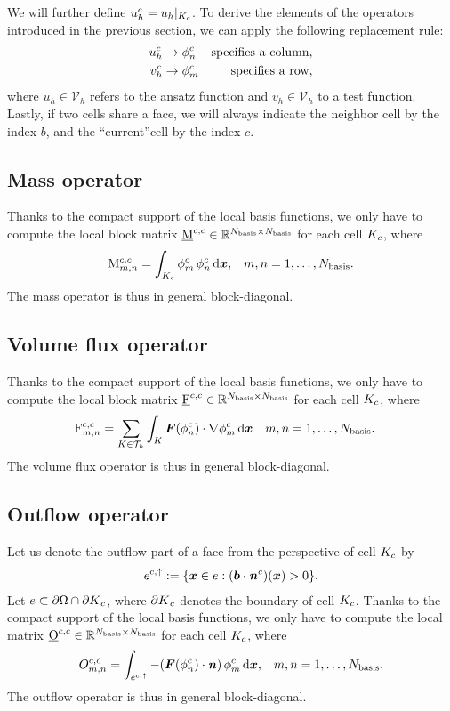 \documentclass{scrreprt}
\begin{document}
We will further define $u_h^c=u_h|_{K_c}$. 
To derive the elements of the operators introduced
in the previous section, we can apply the following replacement rule:
\begin{align}
u_h^{c} &\rightarrow \phi^{c}_{n} & \textup{specifies a column}, \\
v_h^{c} &\rightarrow \phi^{c}_{m} & \textup{specifies a row},
\end{align}
where $u_h\in\mathcal{V}_h$ refers to the ansatz function and  
$v_h\in\mathcal{V}_h$ to a test function.
Lastly, if two cells share a face, we will always indicate the 
neighbor cell by the index $b$, and the ``current''cell
by the index $c$.
\subsection{Mass operator}
Thanks to the compact support of the local basis functions,
we only have to compute the local block matrix
$\underline{\mathrm{M}}^{c,c} \in \mathbb{R}^{N_\textup{basis} \times N_\textup{basis}}$ for each
cell $K_c$, where
\begin{align}
\mathrm{M}^{c,c}_{m,n} =
\int_{K_c}
\phi^{c}_{m}\,\phi^{c}_{n} \, \text{d}{\boldsymbol x},
 && m,n = 1,\ldots,N_\textup{basis}.
\end{align}
The mass operator is thus in general block-diagonal.
\subsection{Volume flux operator}
Thanks to the compact support of the local basis functions,
we only have to compute the local block matrix
$\underline{\mathrm{F}}^{c,c} \in \mathbb{R}^{N_\textup{basis} \times N_\textup{basis}}$ for each
cell $K_c$, where
\begin{align}
\label{eq:volume_flux_op}
\mathrm{F}^{c,c}_{m,n} &= \sum_{K \in \mathcal{T}_h} \int_K {\boldsymbol F}(\phi^{c}_{n}) \cdot
\nabla \phi^{c}_{m}\,\text{d}{\boldsymbol x}
&& m,n = 1,\ldots,N_\textup{basis}.
\end{align}
The volume flux operator is thus in general block-diagonal.
\subsection{Outflow operator}
Let us denote the outflow part of a face from the perspective of cell $K_c$
by
\begin{align}
e^{c,\uparrow} := \{ {\boldsymbol x} \in e : ({\boldsymbol b} \cdot
{\boldsymbol {\mathit{n}}}^{{c}})({\boldsymbol x})> 0\}.
\end{align}
Let $e \subset {\partial\Omega} \cap {\partial K}_c$, where ${\partial K}_c$
denotes the boundary of cell $K_c$.
Thanks to the compact support of the local basis functions, we only
have to compute the local matrix $\underline{\mathrm{O}}^{c,c} \in \mathbb{R}^{N_\textup{basis}
\times N_\textup{basis}}$ for each cell $K_c$, where
\begin{align}
O^{c,c}_{m,n} =
\int_{e^{c,\uparrow}}
-
({\boldsymbol F}(\phi^{c}_{n})\cdot{\boldsymbol {\mathit{n}}})\,\phi^{c}_{m} \, \text{d}{\boldsymbol x},
 && m,n = 1,\ldots,N_\textup{basis}.
\end{align}
The outflow operator is thus in general block-diagonal.
\end{document}
